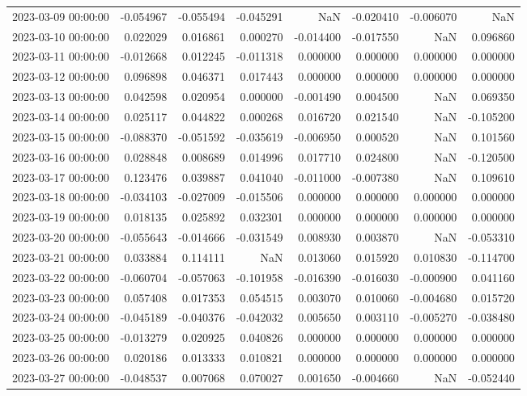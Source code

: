 \begin{tabular}{lrrrrrrr}
2023-03-09 00:00:00 & -0.054967 & -0.055494 & -0.045291 & NaN & -0.020410 & -0.006070 & NaN \\
2023-03-10 00:00:00 & 0.022029 & 0.016861 & 0.000270 & -0.014400 & -0.017550 & NaN & 0.096860 \\
2023-03-11 00:00:00 & -0.012668 & 0.012245 & -0.011318 & 0.000000 & 0.000000 & 0.000000 & 0.000000 \\
2023-03-12 00:00:00 & 0.096898 & 0.046371 & 0.017443 & 0.000000 & 0.000000 & 0.000000 & 0.000000 \\
2023-03-13 00:00:00 & 0.042598 & 0.020954 & 0.000000 & -0.001490 & 0.004500 & NaN & 0.069350 \\
2023-03-14 00:00:00 & 0.025117 & 0.044822 & 0.000268 & 0.016720 & 0.021540 & NaN & -0.105200 \\
2023-03-15 00:00:00 & -0.088370 & -0.051592 & -0.035619 & -0.006950 & 0.000520 & NaN & 0.101560 \\
2023-03-16 00:00:00 & 0.028848 & 0.008689 & 0.014996 & 0.017710 & 0.024800 & NaN & -0.120500 \\
2023-03-17 00:00:00 & 0.123476 & 0.039887 & 0.041040 & -0.011000 & -0.007380 & NaN & 0.109610 \\
2023-03-18 00:00:00 & -0.034103 & -0.027009 & -0.015506 & 0.000000 & 0.000000 & 0.000000 & 0.000000 \\
2023-03-19 00:00:00 & 0.018135 & 0.025892 & 0.032301 & 0.000000 & 0.000000 & 0.000000 & 0.000000 \\
2023-03-20 00:00:00 & -0.055643 & -0.014666 & -0.031549 & 0.008930 & 0.003870 & NaN & -0.053310 \\
2023-03-21 00:00:00 & 0.033884 & 0.114111 & NaN & 0.013060 & 0.015920 & 0.010830 & -0.114700 \\
2023-03-22 00:00:00 & -0.060704 & -0.057063 & -0.101958 & -0.016390 & -0.016030 & -0.000900 & 0.041160 \\
2023-03-23 00:00:00 & 0.057408 & 0.017353 & 0.054515 & 0.003070 & 0.010060 & -0.004680 & 0.015720 \\
2023-03-24 00:00:00 & -0.045189 & -0.040376 & -0.042032 & 0.005650 & 0.003110 & -0.005270 & -0.038480 \\
2023-03-25 00:00:00 & -0.013279 & 0.020925 & 0.040826 & 0.000000 & 0.000000 & 0.000000 & 0.000000 \\
2023-03-26 00:00:00 & 0.020186 & 0.013333 & 0.010821 & 0.000000 & 0.000000 & 0.000000 & 0.000000 \\
2023-03-27 00:00:00 & -0.048537 & 0.007068 & 0.070027 & 0.001650 & -0.004660 & NaN & -0.052440 \\

\end{tabular}
